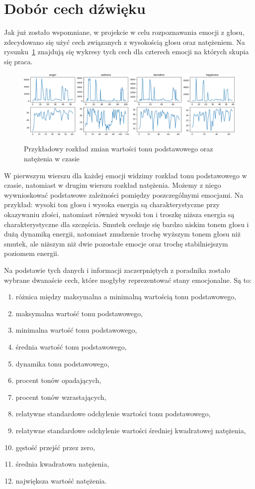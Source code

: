 \documentclass[declaration,shortabstract]{iithesis}
\begin{document}
\section{Dobór cech dźwięku}
Jak już zostało wspomniane, w projekcie w celu rozpoznawania emocji z głosu, zdecydowano się użyć cech związanych z wysokością głosu oraz natężeniem. Na rysunku~\ref{wyk_emo} znajdują się wykresy tych cech dla czterech emocji na których skupia się praca.

\begin{figure}[!h]
\caption{Przykładowy rozkład zmian wartości tonu podstawowego oraz natężenia w czasie}
	\includegraphics[scale=0.3]{b01.png}
\label{wyk_emo}
\end{figure}
	
W pierwszym wierszu dla każdej emocji widzimy rozkład tonu podstawowego w czasie, natomiast w drugim wierszu rozkład natężenia. Możemy z niego wywnioskować podstawowe zależności pomiędzy poszczególnymi emocjami. Na przykład: wysoki ton głosu i wysoka energia są charakterystyczne  przy okazywaniu złości, natomiast również wysoki ton i troszkę niższa energia są charakterystyczne dla szczęścia. Smutek cechuje się bardzo niskim tonem głosu i dużą dynamiką energii, natomiast znudzenie trochę wyższym tonem głosu niż smutek, ale niższym niż dwie pozostałe emocje oraz trochę stabilniejszym poziomem energii. 

Na podstawie tych danych i informacji zaczerpniętych z poradnika  zostało wybrane dwanaście cech, które mogłyby reprezentować stany emocjonalne.
Są to: 
\begin{enumerate}
\item różnica między maksymalna a minimalną wartością tonu podstawowego,
\item maksymalna wartość tonu podstawowego,
\item minimalna wartość tonu podstawowego,
\item średnia wartość tonu podstawowego,
\item dynamika tonu podstawowego,
\item procent tonów opadających,
\item procent tonów wzrastających,
\item relatywne standardowe odchylenie wartości tonu podstawowego,
\item relatywne standardowe odchylenie wartości średniej kwadratowej natężenia,
\item gęstość przejść przez zero,
\item średnia kwadratowa natężenia,
\item największa wartość natężenia.
\end{enumerate}
\end{document}
